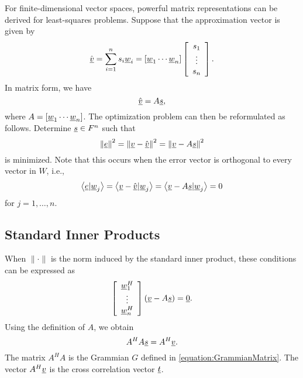 For finite-dimensional vector spaces, powerful matrix representations can be derived for least-squares problems.
Suppose that the approximation vector is given by
\begin{equation*}
\hat{\underline{v}} = \sum_{i=1}^n s_i \underline{w}_i
= \left[ \underline{w}_1 \cdots \underline{w}_n \right]
\left[ \begin{array}{c} s_1 \\ \vdots \\ s_n \end{array} \right] .
\end{equation*}
In matrix form, we have
\begin{equation*}
\hat{\underline{v}} = A \underline{s},
\end{equation*}
where $A = \left[ \underline{w}_1 \cdots \underline{w}_n \right]$.
The optimization problem can then be reformulated as follows.
Determine $\underline{s} \in F^n$ such that
\begin{equation*}
\left\| \underline{e} \right\|^2
= \left\| \underline{v} - \hat{\underline{v}} \right\|^2
= \left\| \underline{v} - A \underline{s} \right\|^2
\end{equation*}
is minimized.
Note that this occurs when the error vector is orthogonal to every vector in $W$, i.e.,
\begin{equation*}
\left\langle \underline{e} | \underline{w}_j \right\rangle
= \left\langle \underline{v} - \hat{\underline{v}} | \underline{w}_j \right\rangle
= \left\langle \underline{v} - A \underline{s} | \underline{w}_j \right\rangle
= 0
\end{equation*}
for $j = 1, \ldots, n$.


\subsection{Standard Inner Products}

When $\| \cdot \|$ is the norm induced by the standard inner product, these conditions can be expressed as
\begin{equation*}
\left[ \begin{array}{c} \underline{w}_1^H \\ \vdots \\ \underline{w}_n^H \end{array} \right] \left( \underline{v} - A \underline{s} \right) = \underline{0} .
\end{equation*}
Using the definition of $A$, we obtain
\begin{equation*}
A^H A \underline{s} = A^H \underline{v} .
\end{equation*}
The matrix $A^H A$ is the Grammian $G$ defined in \eqref{equation:GrammianMatrix}.
The vector $A^H \underline{v}$ is the cross correlation vector $\underline{t}$.

